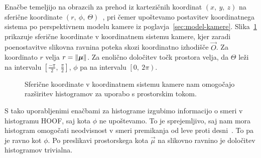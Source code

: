 Enačbe temeljijo na obrazcih za prehod iz kartezičnih koordinat $(x, ~y, ~z)$ na sferične koordinate $(r,~\phi,~\Theta)$~\cite{bronstein1990math}, pri čemer upoštevamo postavitev koordinatnega sistema po perspektivnem modelu kamere iz poglavja~\ref{sec:model-kamere}. Slika~\ref{fig:sphere} prikazuje sferične koordinate v koordinatnem sistemu kamere, kjer zaradi poenostavitve slikovna ravnina poteka skozi koordinatno izhodišče $\vec{O}$. Za koordinato $r$ velja $r=\left\lVert {\boldsymbol{\mu}} \right\rVert$. Za enolično določitev točk prostora velja, da $\Theta$ leži na intervalu $\left[\frac{-\pi}{2},~\frac{\pi}{2}\right]$, $\phi$ pa na intervalu $\left[0,~2\pi\right)$.

\begin{figure}[htb]
	\centering
	
	\caption[Sferične koordinate v koordinatnem sistemu kamere]{Sferične koordinate v koordinatnem sistemu kamere nam omogočajo razširitev histogramov za uporabo s prostorskim tokom.}
	\label{fig:sphere}
\end{figure}

S tako uporabljenimi enačbami za histograme izgubimo informacijo o smeri v histogramu HOOF, saj kota $\phi$ ne upoštevamo. To je sprejemljivo, saj nam mora histogram omogočati neodvisnost v smeri premikanja od leve proti desni~\cite{chaudhry2009histograms}. To pa je ravno kot $\phi$. Po preslikavi prostorskega kota $\vec{\mu}$ na slikovno ravnino je določitev histogramov trivialna. 
